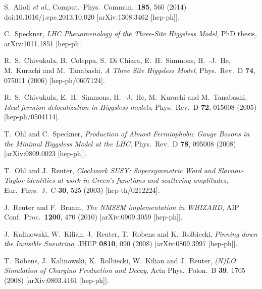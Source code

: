 \documentclass[12pt]{book}
\begin{document}
\begin{thebibliography}{19}
  S.~Alioli {\it et al.},
  Comput.\ Phys.\ Commun.\  {\bf 185}, 560 (2014)
  doi:10.1016/j.cpc.2013.10.020
  [arXiv:1308.3462 [hep-ph]].

  C.~Speckner,
  {\em LHC Phenomenology of the Three-Site Higgsless Model},
  PhD thesis, arXiv:1011.1851 [hep-ph].

  R.~S.~Chivukula, B.~Coleppa, S.~Di Chiara, E.~H.~Simmons, H.~-J.~He,
  M.~Kurachi and M.~Tanabashi,
  {\em A Three Site Higgsless Model},
  Phys.\ Rev.\ D {\bf 74}, 075011 (2006)
  [hep-ph/0607124].

  R.~S.~Chivukula, E.~H.~Simmons, H.~-J.~He, M.~Kurachi and M.~Tanabashi,
  {\em Ideal fermion delocalization in Higgsless models},
  Phys.\ Rev.\ D {\bf 72}, 015008 (2005)
  [hep-ph/0504114].

  T.~Ohl and C.~Speckner,
  {\em Production of Almost Fermiophobic Gauge Bosons in the Minimal
    Higgsless Model at the LHC},
  Phys.\ Rev.\ D {\bf 78}, 095008 (2008)
  [arXiv:0809.0023 [hep-ph]].

  T.~Ohl and J.~Reuter,
  {\em Clockwork SUSY: Supersymmetric Ward and Slavnov-Taylor
    identities at work in Green's functions and scattering
    amplitudes},
  Eur.\ Phys.\ J.\ C {\bf 30}, 525 (2003)
  [hep-th/0212224].

  J.~Reuter and F.~Braam,
  {\em The NMSSM implementation in WHIZARD},
  AIP Conf.\ Proc.\  {\bf 1200}, 470 (2010)
  [arXiv:0909.3059 [hep-ph]].

  J.~Kalinowski, W.~Kilian, J.~Reuter, T.~Robens and K.~Rolbiecki,
  {\em Pinning down the Invisible Sneutrino},
  JHEP {\bf 0810}, 090 (2008)
  [arXiv:0809.3997 [hep-ph]].

  T.~Robens, J.~Kalinowski, K.~Rolbiecki, W.~Kilian and J.~Reuter,
  {\em (N)LO Simulation of Chargino Production and Decay},
  Acta Phys.\ Polon.\ B {\bf 39}, 1705 (2008)
  [arXiv:0803.4161 [hep-ph]].


\end{thebibliography}
\end{document}
